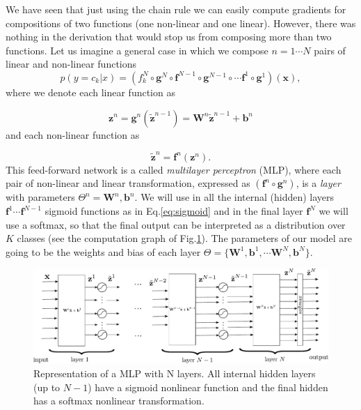 We have seen that just using the chain rule we can easily compute gradients for
compositions of two functions (one non-linear and one linear). However, there
was nothing in the derivation that would stop us from composing more than two
functions. 
Let us imagine a general case in which we compose $n=1 \cdots N$
pairs of linear and non-linear functions 
%
\begin{equation}
p(y=c_k|{x}) = (f_k^N \circ \mathbf{g}^N \circ \mathbf{f}^{N-1} \circ \mathbf{g}^{N-1} \circ \cdots \mathbf{f}^1 \circ \mathbf{g}^1)(\mathbf{x}),
\label{eq:FeedForward}
\end{equation}
%
\noindent where we denote each linear function as

\begin{equation}
\mathbf{z}^n = \mathbf{g}^n(\tilde{\mathbf{z}}^{n-1}) = \mathbf{W}^n \tilde{\mathbf{z}}^{n-1} + \mathbf{b}^n 
\end{equation}
%
\noindent and each non-linear function as 

\begin{equation}
\tilde{\mathbf{z}}^n = \mathbf{f}^n(\mathbf{z}^n).
\end{equation}
%
This feed-forward network is a called \textit{multilayer perceptron} (MLP), where each pair of non-linear and linear transformation, expressed as $(\mathbf{f}^n \circ \mathbf{g}^n)$, is a \textit{layer} with parameters $\Theta^n={\mathbf{W}^n, \mathbf{b}^n}$. We will use in all the internal (hidden) layers $\mathbf{f}^1 \cdots \mathbf{f}^{N-1}$ sigmoid functions as in Eq.\ref{eq:sigmoid} and in the final layer $\mathbf{f}^N$ we will use a softmax, so that the final output
can be interpreted as a distribution over $K$ classes (see the computation graph of Fig.\ref{fig:MLP}). The parameters of our
model are going to be the weights and bias of each layer
$\Theta=\{\mathbf{W}^1, \mathbf{b}^1, \cdots \mathbf{W}^N, \mathbf{b}^N\}$.

\begin{figure}
\centering
\includegraphics[scale=0.5]{figs/deep_learning/MLP.pdf}
\caption{Representation of a MLP with N layers. All internal hidden layers (up to $N-1$) have a sigmoid nonlinear function and the final hidden has a softmax nonlinear transformation.}
\label{fig:MLP}
\end{figure}



